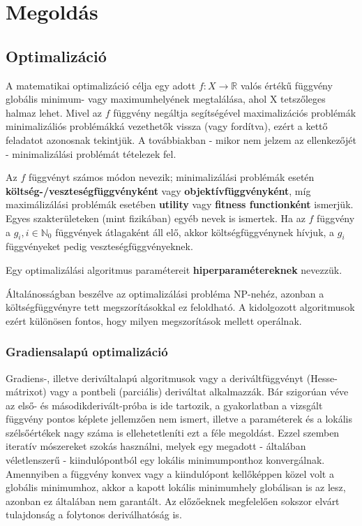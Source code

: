 \section{Megoldás}

\subsection{Optimalizáció}

A matematikai optimalizáció célja egy adott $f: X \rightarrow \mathbb{R} $ valós értékű függvény globális minimum- vagy maximumhelyének megtalálása, ahol X tetszőleges halmaz lehet. Mivel az $f$ függvény negáltja segítségével maximalizációs problémák minimalizáliós problémákká vezethetők vissza (vagy fordítva), ezért a kettő feladatot azonosnak tekintjük. A továbbiakban - mikor nem jelzem az ellenkezőjét - minimalizálási problémát tételezek fel.

\begin{definition}
Az $f$ függvényt számos módon nevezik; minimalizálási problémák esetén \textbf{költség-/veszteségfüggvényként} vagy \textbf{objektívfüggvényként}, míg maximálizálási problémák esetében \textbf{utility} vagy \textbf{fitness functionként} ismerjük. Egyes szakterületeken (mint fizikában) egyéb nevek is ismertek. Ha az $f$ függvény a $g_i, i \in \mathbb{N}_0$ függvények átlagaként áll elő, akkor költségfüggvénynek hívjuk, a $g_i$ függvényeket pedig veszteségfüggvényeknek.
\end{definition}

\begin{definition}
Egy optimalizálási algoritmus paramétereit \textbf{hiperparamétereknek} nevezzük.
\end{definition}

Általánosságban beszélve az optimalizálási probléma NP-nehéz, azonban a költségfüggvényre tett megszorításokkal ez feloldható. A kidolgozott algoritmusok ezért különösen fontos, hogy milyen megszorítások mellett operálnak.

\subsubsection{Gradiensalapú optimalizáció}
Gradiens-, illetve deriváltalapú algoritmusok vagy a deriváltfüggvényt (Hesse-mátrixot) vagy a pontbeli (parciális) deriváltat alkalmazzák. Bár szigorúan véve az első- és másodikderivált-próba is ide tartozik, a gyakorlatban a vizsgált függvény pontos képlete jellemzően nem ismert, illetve a paraméterek és a lokális szélsőértékek nagy száma is ellehetetleníti ezt a féle megoldást. Ezzel szemben iteratív mószereket szokás használni, melyek egy megadott - általában véletlenszerű - kiindulópontból egy lokális minimumponthoz konvergálnak. Amennyiben a függvény konvex vagy a kiindulópont kellőképpen közel volt a globális minimumhoz, akkor a kapott lokális minimumhely globálisan is az lesz, azonban ez általában nem garantált. Az előzőeknek megfelelően sokszor elvárt tulajdonság a folytonos deriválhatóság is.


